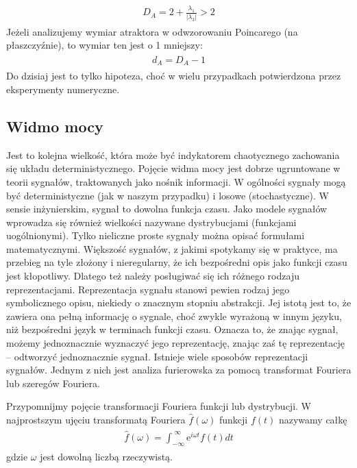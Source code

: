 \documentclass[a4paper,12pt,polish]{sphinxmanual}
\begin{document}
\label{ch2/chII012:equation-eqn18}\begin{gather}
\begin{split} D_A = 2 +  \frac{\lambda_1}{|\lambda_3|}  >  2\end{split}\label{ch2/chII012-eqn18}
\end{gather}
Jeżeli analizujemy wymiar atraktora w odwzorowaniu Poincarego (na płaszczyźnie), to wymiar ten jest o 1 mniejszy:
\label{ch2/chII012:equation-eqn19}\begin{gather}
\begin{split}d_A = D_A -1\end{split}\label{ch2/chII012-eqn19}
\end{gather}
Do dzisiaj jest to tylko hipoteza, choć w wielu przypadkach potwierdzona przez eksperymenty numeryczne.


\subsection{Widmo mocy}
\label{ch2/chII012:widmo-mocy}
Jest to kolejna wielkość, która może być indykatorem chaotycznego zachowania się układu deterministycznego. Pojęcie widma mocy jest dobrze ugruntowane w teorii sygnałów, traktowanych jako nośnik informacji. W ogólności sygnały mogą być deterministyczne (jak w naszym przypadku) i losowe (stochastyczne). W sensie inżynierskim, sygnał to dowolna funkcja czasu.  Jako modele sygnałów wprowadza się również wielkości nazywane dystrybucjami (funkcjami uogólnionymi). Tylko  nieliczne proste sygnały można opisać formułami matematycznymi.  Większość sygnałów, z jakimi spotykamy się w praktyce, ma przebieg na tyle złożony i nieregularny, że ich bezpośredni opis  jako funkcji czasu jest kłopotliwy.  Dlatego też należy posługiwać się  ich różnego rodzaju reprezentacjami. Reprezentacja sygnału stanowi pewien rodzaj jego symbolicznego opisu, niekiedy o znacznym stopniu abstrakcji. Jej istotą jest to, że zawiera ona pełną informację o sygnale, choć zwykle wyrażoną w innym języku, niż bezpośredni język  w terminach funkcji czasu.  Oznacza to, że znając sygnał, możemy jednoznacznie wyznaczyć jego reprezentację, znając zaś tę reprezentację – odtworzyć jednoznacznie sygnał. Istnieje wiele sposobów reprezentacji sygnałów. Jednym z nich jest analiza furierowska za pomocą transformat Fouriera lub szeregów Fouriera.

Przypomnijmy pojęcie transformacji Fouriera funkcji lub dystrybucji. W najprostszym ujęciu transformatą  Fouriera ${\hat f}(\omega)$  funkcji $f(t)$ nazywamy całkę
\label{ch2/chII012:equation-eqn20}\begin{gather}
\begin{split}{\hat f}(\omega) = \int_{-\infty}^{\; \infty}  \mbox{e}^{i \omega t} f(t)  dt\end{split}\label{ch2/chII012-eqn20}
\end{gather}
gdzie $\omega$ jest dowolną liczbą rzeczywistą.
\end{document}
